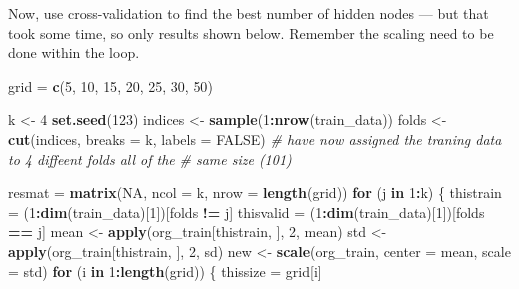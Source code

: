 \documentclass[10pt,ignorenonframetext,]{beamer}
\newenvironment{Shaded}{\begin{snugshade}}{\end{snugshade}}
\newcommand{\CommentTok}[1]{\textcolor[rgb]{0.56,0.35,0.01}{\textit{#1}}}
\newcommand{\ControlFlowTok}[1]{\textcolor[rgb]{0.13,0.29,0.53}{\textbf{#1}}}
\newcommand{\DataTypeTok}[1]{\textcolor[rgb]{0.13,0.29,0.53}{#1}}
\newcommand{\DecValTok}[1]{\textcolor[rgb]{0.00,0.00,0.81}{#1}}
\newcommand{\KeywordTok}[1]{\textcolor[rgb]{0.13,0.29,0.53}{\textbf{#1}}}
\newcommand{\NormalTok}[1]{#1}
\newcommand{\OperatorTok}[1]{\textcolor[rgb]{0.81,0.36,0.00}{\textbf{#1}}}
\newcommand{\OtherTok}[1]{\textcolor[rgb]{0.56,0.35,0.01}{#1}}
\newcommand{\StringTok}[1]{\textcolor[rgb]{0.31,0.60,0.02}{#1}}
\begin{document}
\begin{frame}[fragile]

Now, use cross-validation to find the best number of hidden nodes ---
but that took some time, so only results shown below. Remember the
scaling need to be done within the loop.

\scriptsize

\begin{Shaded}
\begin{Highlighting}[]
\NormalTok{grid =}\StringTok{ }\KeywordTok{c}\NormalTok{(}\DecValTok{5}\NormalTok{, }\DecValTok{10}\NormalTok{, }\DecValTok{15}\NormalTok{, }\DecValTok{20}\NormalTok{, }\DecValTok{25}\NormalTok{, }\DecValTok{30}\NormalTok{, }\DecValTok{50}\NormalTok{)}

\NormalTok{k <-}\StringTok{ }\DecValTok{4}
\KeywordTok{set.seed}\NormalTok{(}\DecValTok{123}\NormalTok{)}
\NormalTok{indices <-}\StringTok{ }\KeywordTok{sample}\NormalTok{(}\DecValTok{1}\OperatorTok{:}\KeywordTok{nrow}\NormalTok{(train_data))}
\NormalTok{folds <-}\StringTok{ }\KeywordTok{cut}\NormalTok{(indices, }\DataTypeTok{breaks =}\NormalTok{ k, }\DataTypeTok{labels =} \OtherTok{FALSE}\NormalTok{)}
\CommentTok{# have now assigned the traning data to 4 diffeent folds all of the}
\CommentTok{# same size (101)}

\NormalTok{resmat =}\StringTok{ }\KeywordTok{matrix}\NormalTok{(}\OtherTok{NA}\NormalTok{, }\DataTypeTok{ncol =}\NormalTok{ k, }\DataTypeTok{nrow =} \KeywordTok{length}\NormalTok{(grid))}
\ControlFlowTok{for}\NormalTok{ (j }\ControlFlowTok{in} \DecValTok{1}\OperatorTok{:}\NormalTok{k) \{}
\NormalTok{    thistrain =}\StringTok{ }\NormalTok{(}\DecValTok{1}\OperatorTok{:}\KeywordTok{dim}\NormalTok{(train_data)[}\DecValTok{1}\NormalTok{])[folds }\OperatorTok{!=}\StringTok{ }\NormalTok{j]}
\NormalTok{    thisvalid =}\StringTok{ }\NormalTok{(}\DecValTok{1}\OperatorTok{:}\KeywordTok{dim}\NormalTok{(train_data)[}\DecValTok{1}\NormalTok{])[folds }\OperatorTok{==}\StringTok{ }\NormalTok{j]}
\NormalTok{    mean <-}\StringTok{ }\KeywordTok{apply}\NormalTok{(org_train[thistrain, ], }\DecValTok{2}\NormalTok{, mean)}
\NormalTok{    std <-}\StringTok{ }\KeywordTok{apply}\NormalTok{(org_train[thistrain, ], }\DecValTok{2}\NormalTok{, sd)}
\NormalTok{    new <-}\StringTok{ }\KeywordTok{scale}\NormalTok{(org_train, }\DataTypeTok{center =}\NormalTok{ mean, }\DataTypeTok{scale =}\NormalTok{ std)}
    \ControlFlowTok{for}\NormalTok{ (i }\ControlFlowTok{in} \DecValTok{1}\OperatorTok{:}\KeywordTok{length}\NormalTok{(grid)) \{}
\NormalTok{        thissize =}\StringTok{ }\NormalTok{grid[i]}
        

\end{Highlighting}
\end{Shaded}
\end{frame}
\end{document}
